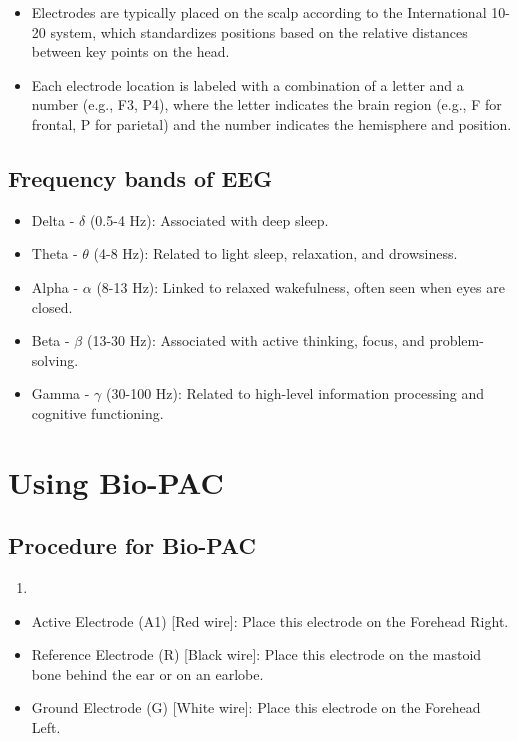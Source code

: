\documentclass[
  11pt,
  letterpaper,
  DIV=11,
  numbers=noendperiod]{scrreprt}
\providecommand{\tightlist}{%
  \setlength{\itemsep}{0pt}\setlength{\parskip}{0pt}}\usepackage{longtable,booktabs,array}
\begin{document}
\begin{itemize}
\tightlist
\item
  Electrodes are typically placed on the scalp according to the
  International 10-20 system, which standardizes positions based on the
  relative distances between key points on the head.
\item
  Each electrode location is labeled with a combination of a letter and
  a number (e.g., F3, P4), where the letter indicates the brain region
  (e.g., F for frontal, P for parietal) and the number indicates the
  hemisphere and position.
\end{itemize}

\subsection{Frequency bands of EEG}\label{frequency-bands-of-eeg}

\begin{itemize}
\tightlist
\item
  Delta - \(\delta\) (0.5-4 Hz): Associated with deep sleep.
\item
  Theta - \(\theta\) (4-8 Hz): Related to light sleep, relaxation, and
  drowsiness.
\item
  Alpha - \(\alpha\) (8-13 Hz): Linked to relaxed wakefulness, often
  seen when eyes are closed.
\item
  Beta - \(\beta\) (13-30 Hz): Associated with active thinking, focus,
  and problem-solving.
\item
  Gamma - \(\gamma\) (30-100 Hz): Related to high-level information
  processing and cognitive functioning.
\end{itemize}

\section{Using Bio-PAC}\label{using-bio-pac}

\subsection{Procedure for Bio-PAC}\label{procedure-for-bio-pac}

\begin{enumerate}
\def\labelenumi{\arabic{enumi}.}
\tightlist
\item
\end{enumerate}

\begin{itemize}
\tightlist
\item
  Active Electrode (A1) {[}Red wire{]}: Place this electrode on the
  Forehead Right.
\item
  Reference Electrode (R) {[}Black wire{]}: Place this electrode on the
  mastoid bone behind the ear or on an earlobe.
\item
  Ground Electrode (G) {[}White wire{]}: Place this electrode on the
  Forehead Left.
\end{itemize}
\end{document}
